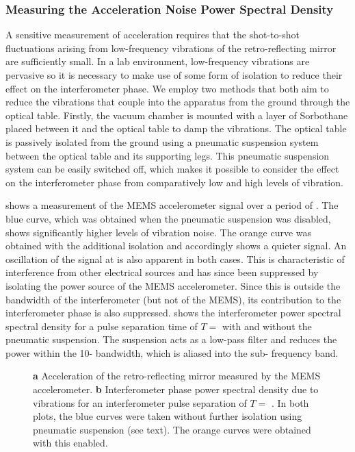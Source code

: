 \subsubsection{Measuring the Acceleration Noise Power Spectral Density}
A sensitive measurement of acceleration requires that the shot-to-shot
fluctuations arising from low-frequency vibrations of the retro-reflecting
mirror are sufficiently small. In a lab environment, low-frequency
vibrations are pervasive so it is necessary to make use of some form
of isolation to reduce their effect on the interferometer phase.
We employ two methods that both aim to reduce the
vibrations that couple into the apparatus from the ground through the
optical table. Firstly, the vacuum
chamber is mounted with a layer of Sorbothane placed between it and the optical
table to damp the vibrations. The optical table is passively isolated
from the ground using a pneumatic suspension system between the optical table and its
supporting legs. This pneumatic suspension system can be easily
switched off, which makes it possible to consider the effect on the
interferometer phase 
from comparatively low and high levels of vibration.
\par\noindent
{} shows a measurement of the MEMS
accelerometer signal over a period of . The blue curve,
which was obtained when the pneumatic suspension was disabled, shows
significantly higher levels of vibration noise. The orange curve was
obtained with the additional isolation and accordingly shows a quieter
signal. An oscillation of the
signal at  is also apparent in both cases. This is
characteristic of interference from other electrical sources and has
since been suppressed by isolating the power source of the MEMS
accelerometer. Since this is outside the bandwidth of the
interferometer (but not of the MEMS), its contribution to the
interferometer phase is also suppressed. 
shows the interferometer power spectral spectral density for a pulse
separation time of $T = $  with and
without the pneumatic suspension. The suspension acts as a
low-pass filter and reduces the power within the
10- bandwidth, which is aliased into the
sub- 
frequency band. 
\begin{figure}[htpb!]
  \centering
  \caption[Interferometer power spectral density due to vibration
  noise.]{\textbf{a} Acceleration of the retro-reflecting mirror
    measured by the MEMS accelerometer. \textbf{b} Interferometer 
  phase power spectral density due to vibrations for an interferometer
pulse separation of $T = $ . In both plots, the blue
curves were taken without further isolation using pneumatic suspension
(see text). The orange curves were obtained with this enabled.} 
  \label{fig:vibration_spectrum}
\end{figure}
